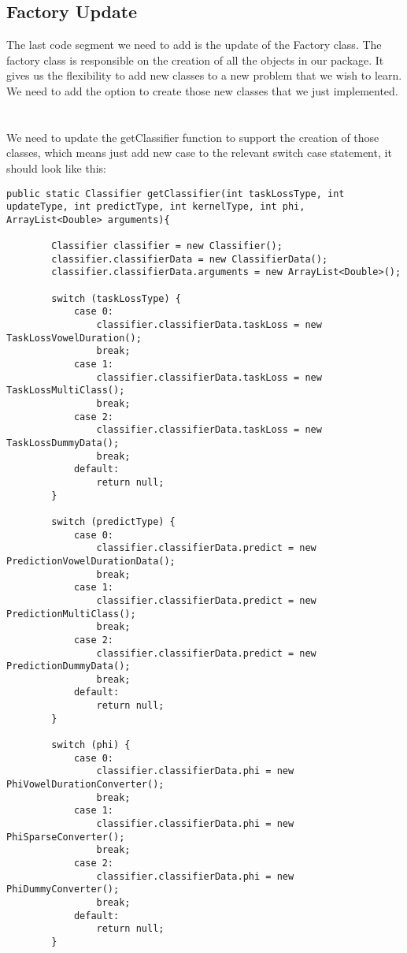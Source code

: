 \documentclass[11pt, oneside]{article}   	%
\begin{document}
\subsection{Factory Update}
The last code segment we need to add is the update of the Factory class. The factory class is responsible on the creation of all the objects in our package. It gives us the flexibility to add new classes to a new problem that we wish to learn.
We need to add the option to create those new classes that we just implemented. \\ \\ \\
We need to update the getClassifier function to support the creation of those classes, which means just add new case to the relevant switch case statement,  it should look like this: 
\begin{lstlisting}
public static Classifier getClassifier(int taskLossType, int updateType, int predictType, int kernelType, int phi, ArrayList<Double> arguments){
		
		Classifier classifier = new Classifier();
        classifier.classifierData = new ClassifierData();
        classifier.classifierData.arguments = new ArrayList<Double>();
		
		switch (taskLossType) {
			case 0:
                classifier.classifierData.taskLoss = new TaskLossVowelDuration();
				break;
			case 1:
                classifier.classifierData.taskLoss = new TaskLossMultiClass();
				break;
            case 2:
                classifier.classifierData.taskLoss = new TaskLossDummyData();
                break;
			default:
				return null;
		}

        switch (predictType) {
            case 0:
                classifier.classifierData.predict = new PredictionVowelDurationData();
                break;
            case 1:
                classifier.classifierData.predict = new PredictionMultiClass();
                break;
            case 2:
                classifier.classifierData.predict = new PredictionDummyData();
                break;
            default:
                return null;
        }

        switch (phi) {
            case 0:
                classifier.classifierData.phi = new PhiVowelDurationConverter();
                break;
            case 1:
                classifier.classifierData.phi = new PhiSparseConverter();
                break;
            case 2:
                classifier.classifierData.phi = new PhiDummyConverter();
                break;
            default:
                return null;
        }


\end{lstlisting}
\end{document}
